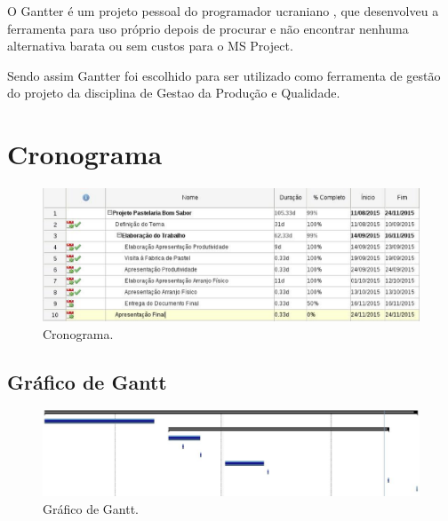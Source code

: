 O Gantter é um projeto pessoal do programador ucraniano \cite{VMazepa}, que desenvolveu a ferramenta para uso próprio depois de procurar e não encontrar nenhuma alternativa barata ou sem custos para o MS Project.

Sendo assim Gantter foi escolhido para ser utilizado como ferramenta de gestão do projeto da disciplina de Gestao da Produção e Qualidade.

\section{Cronograma}

\begin{figure}[H]
    \centering
  \includegraphics[keepaspectratio=true,scale=0.5]{figuras/cronograma.eps}
    \caption{Cronograma.}
    \label{fig:cronograma}
\end{figure}

\subsection{Gráfico de Gantt}

\begin{figure}[H]
    \centering
  \includegraphics[keepaspectratio=true,scale=0.5]{figuras/grafico_gantt.eps}
    \caption{Gráfico de Gantt.}
    \label{fig:grafico_gantt}
\end{figure}